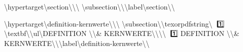 \textbackslash{}hypertarget\textbackslash{}{section\textbackslash{}}\textbackslash{}{\textbackslash{}%
\textbackslash{}subsection\textbackslash{}{\textbackslash{}}\textbackslash{}label\textbackslash{}{section\textbackslash{}}\textbackslash{}}

\textbackslash{}hypertarget\textbackslash{}{definition-kernwerte\textbackslash{}}\textbackslash{}{\textbackslash{}%
\textbackslash{}subsection\textbackslash{}{\textbackslash{}texorpdfstring\textbackslash{}{🔑 1️⃣ \textbackslash{}textbf\textbackslash{}{\textbackslash{}ul\textbackslash{}{DEFINITION \textbackslash{}\textbackslash{}& KERNWERTE\textbackslash{}}\textbackslash{}}\textbackslash{}}\textbackslash{}{🔑 1️⃣ DEFINITION \textbackslash{}\textbackslash{}& KERNWERTE\textbackslash{}}\textbackslash{}}\textbackslash{}label\textbackslash{}{definition-kernwerte\textbackslash{}}\textbackslash{}}

